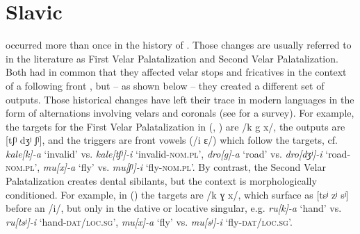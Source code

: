\section{Slavic}
 occurred more than once in the history of  \citep{Carlton1990}. Those changes are usually referred to in the literature as First Velar Palatalization and Second Velar Palatalization. Both had in common that they affected velar stops and fricatives in the context of a following front , but -- as shown below -- they created a different set of outputs. Those historical changes have left their trace in modern  languages in the form of alternations involving velars and coronals (see \citealt{Rubach2011} for a survey). For example, the targets for the First Velar Palatalization in  (, ) are /k g x/, the outputs are [tʃʲ dʒʲ  ʃʲ], and the triggers are front vowels (/i ɛ/) which follow the targets, cf. \textit{kale[k]-a} ‘invalid’ vs. \textit{kale[tʃʲ]-i} ‘invalid-\textsc{nom}.\textsc{pl}’, \textit{dro[g]-a} ‘road' vs. \textit{dro[dʒʲ]-i} ‘road-\textsc{nom.pl}’, \textit{mu[x]-a} ‘fly' vs. \textit{mu[ʃʲ]-i} ‘fly-\textsc{nom.pl}’. By contrast, the Second Velar Palatalization creates dental sibilants, but the context is morphologically conditioned. For example, in  () the targets are /k ɣ x/, which surface as [tsʲ zʲ sʲ] before an /i/, but only in the dative or locative singular, e.g. \textit{ru[k]-a} ‘hand’ vs. \textit{ru[tsʲ]-i} ‘hand-\textsc{dat/loc}.\textsc{sg}’, \textit{mu[x]-a} ‘fly' vs. \textit{mu[sʲ]-i} ‘fly-\textsc{dat/loc.sg}'.

